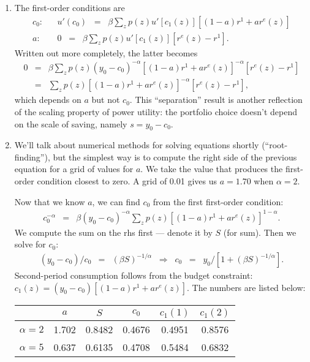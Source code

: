 \documentclass[11pt]{article}
\begin{document}
\begin{enumerate}
\begin{enumerate}
\item The first-order conditions are
\begin{eqnarray*}
    c_0:  &&  u'(c_0) \;\;=\;\; \beta \sum_z p(z)
            u'[c_1(z)] [ (1-a)r^1 + a r^e(z)] \\
    a:    && 0 \;\;=\;\; \beta \sum_z p(z) u'[c_1(z)] [r^e(z) - r^1 ]  .
\end{eqnarray*}
Written out more completely, the latter becomes
\begin{eqnarray*}
    0 &=& \beta \sum_z p(z) (y_0-c_0)^{-\alpha} [ (1-a)r^1 + a r^e(z)]^{-\alpha} [r^e(z) - r^1 ] \\
    &=&  \sum_z p(z) [ (1-a)r^1 + a r^e(z)]^{-\alpha} [r^e(z) - r^1 ] ,
\end{eqnarray*}
which depends on $a$ but not $c_0$.
This ``separation'' result is another reflection of the scaling property of
power utility:  the portfolio choice doesn't depend on the scale of saving, namely
$ s = y_0 - c_0 $.

\item
We'll talk about numerical methods for solving equations shortly (``root-finding''),
but the simplest way is to compute the right side of the previous equation
for a grid of values for $a$.
We take the value that produces the first-order condition closest to zero.
A grid of 0.01 gives us $a=1.70$ when $\alpha=2$.

Now that we know $a$, we can find $c_0$ from the first first-order condition:
\begin{eqnarray*}
    c_0^{-\alpha}  &=&  \beta (y_0-c_0)^{-\alpha}
            \sum_z p(z) [ (1-a)r^1 + a r^e(z)]^{1-\alpha}  .
\end{eqnarray*}
We compute the sum on the rhs first --- denote it by $S$ (for sum).
Then we solve for $c_0$:
\begin{eqnarray*}
    (y_0-c_0)/c_0 &=& (\beta S)^{-1/\alpha}
        \;\;\Rightarrow\;\;
        c_0  \;\;=\;\; y_0 /[ 1 + (\beta S)^{-1/\alpha}] .
\end{eqnarray*}
Second-period consumption follows from the budget constraint:
$c_1(z)=  (y_0-c_0)[(1-a) r^1 + a r^e(z)] $.
The numbers are listed below:
\begin{center}
\begin{tabular}{lccccc}
\toprule
                &  $a$  &  $S$    & $c_0$   &  $c_1(1)$ &  $c_1(2)$  \\
\midrule
$\alpha = 2$    & 1.702 & 0.8482  & 0.4676  & 0.4951    & 0.8576 \\
$\alpha = 5$    & 0.637 & 0.6135  & 0.4708  & 0.5484    & 0.6832 \\
\bottomrule
\end{tabular}
\end{center}


\end{enumerate}
\end{enumerate}
\end{document}
